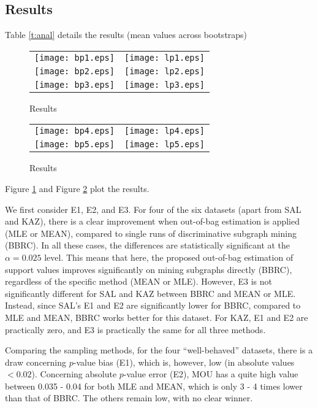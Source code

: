 \documentclass{article}
\begin{document}
\subsection{Results}
\label{ss:Results}

Table \ref{t:anal} details the results (mean values across bootstraps)

%
\begin{figure}[t]
  \begin{tabular}{cc}
   \texttt{[image: bp1.eps]} & \texttt{[image: lp1.eps]} \\
   \texttt{[image: bp2.eps]} & \texttt{[image: lp2.eps]} \\
   \texttt{[image: bp3.eps]} & \texttt{[image: lp3.eps]} \\
  \end{tabular}
  \caption{Results}
  \label{fig:bplp13}
\end{figure}
\begin{figure}[t]
  \begin{tabular}{cc}
   \texttt{[image: bp4.eps]} & \texttt{[image: lp4.eps]} \\
   \texttt{[image: bp5.eps]} & \texttt{[image: lp5.eps]} \\
  \end{tabular}
  \caption{Results}
  \label{fig:bplp45}
\end{figure}
Figure \ref{fig:bplp13} and Figure \ref{fig:bplp45} plot the results. 

We first consider E1, E2, and E3. 
For four of the six datasets (apart from SAL and KAZ), there is a clear improvement when out-of-bag estimation is applied (MLE or MEAN), compared to single runs of discriminative subgraph mining (BBRC).
In all these cases, the differences are statistically significant at the $\alpha=0.025$ level. 
This means that here, the proposed out-of-bag estimation of support values improves significantly on mining subgraphs directly (BBRC), regardless of the specific method (MEAN or MLE). 
However, E3 is not significantly different for SAL and KAZ between BBRC and MEAN or MLE. Instead, since SAL's E1 and E2 are significantly lower for BBRC, compared to MLE and MEAN, BBRC works better for this dataset.
For KAZ, E1 and E2 are practically zero, and E3 is practically the same for all three methods.

Comparing the sampling methods, for the four ``well-behaved'' datasets, there is a draw concerning $p$-value bias (E1), which is, however, low (in absolute values $<0.02$). Concerning absolute $p$-value error (E2), MOU has a quite high value between 0.035 - 0.04 for both MLE and MEAN, which is only 3 - 4 times lower than that of BBRC. The others remain low, with no clear winner. 
\end{document}
